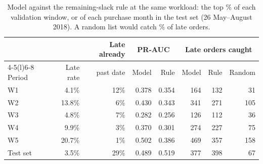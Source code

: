 \begin{table}[ht]
\centering\small
\caption{Model against the remaining-slack rule at the same workload: the top \ActShare{}\% of each validation window, or of each purchase month in the test set (26 May--August 2018). A random list would catch \ActShare{}\% of late orders.}
\label{tab:period-value}
\begin{tabular}{@{}lrrrrrrr@{}}
\toprule
& & Late already & \multicolumn{2}{c}{PR-AUC} & \multicolumn{3}{c}{Late orders caught} \\
\cmidrule(lr){4-5}\cmidrule(l){6-8}
Period & Late rate & past date & Model & Rule & Model & Rule & Random \\
\midrule
W1 & 4.1\% & 12\% & 0.378 & 0.354 & 164 & 132 & 31 \\
W2 & 13.8\% & 6\% & 0.430 & 0.343 & 341 & 271 & 105 \\
W3 & 4.8\% & 7\% & 0.282 & 0.256 & 126 & 112 & 36 \\
W4 & 9.9\% & 3\% & 0.370 & 0.301 & 274 & 227 & 75 \\
W5 & 20.7\% & 1\% & 0.502 & 0.386 & 469 & 357 & 158 \\
Test set & 3.5\% & 29\% & 0.489 & 0.519 & 377 & 398 & 67 \\
\bottomrule
\end{tabular}
\end{table}
